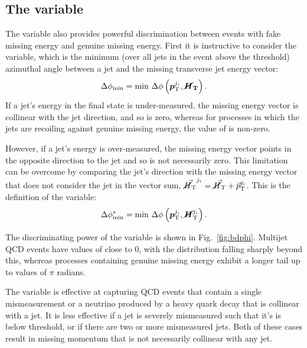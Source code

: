 \subsection{The \bdphi variable}

The \bdphi variable also provides powerful discrimination between events with 
fake missing energy and genuine missing energy.
First it is instructive to consider the \dphimin variable, which is the minimum 
(over all jets in the event above the \pt threshold) azimuthal angle between a 
jet and the missing transverse jet energy vector:
\begin{equation}
\Delta\phi_{\mathrm{min}} = \mathrm{min}~\Delta\phi\left(\bm{p}_{\mathrm 
T}^{j_i},\bm{\cancel{H}_\mathrm{T}}\right).
\end{equation}
If a jet's energy in the final state is under-measured, the missing energy 
vector is collinear with the jet direction, and so \dphimin is zero, whereas 
for processes in which the jets are recoiling against genuine missing energy, 
the value of \dphimin is non-zero.

However, if a jet's energy is over-measured, the missing energy vector points 
in the opposite direction to the jet and so \dphimin is not necessarily zero. 
This limitation can be overcome by comparing the jet's direction with the 
missing energy vector that does not consider the jet in the vector sum, 
$\vec{\mbox{$\cancel{H}_\text{T}$}}^{j_i} = \vec{\mbox{$\cancel{H}_\text{T}$}} + \vec{p}_{\mathrm T}^{j_i}$. This is the 
definition of the 
\bdphi variable:
\begin{equation}
\Delta\phi^{*}_{\mathrm{min}} = \mathrm{min}~\Delta\phi\left(\bm{p}_{\mathrm 
	T}^{j_i},\bm{\cancel{H}}_\mathrm{T}^{j_i}\right).
\end{equation}

The discriminating power of the \bdphi variable is shown in 
Fig.~\ref{fig:bdphi}. Multijet QCD events have values of \bdphi close to 0, 
with the distribution falling sharply beyond this, 
whereas processes containing genuine missing energy exhibit a longer tail up to 
values of $\pi$ radians.

The \bdphi variable is effective at capturing QCD events that contain a single 
mismeasurement or a neutrino produced by a heavy quark decay that is collinear 
with a jet. It is less effective if a jet is severely mismeasured such 
that it's \pt is below threshold, or if there are two or more mismeasured jets. 
Both of these cases result in missing momentum that is not necessarily 
collinear with any jet.

